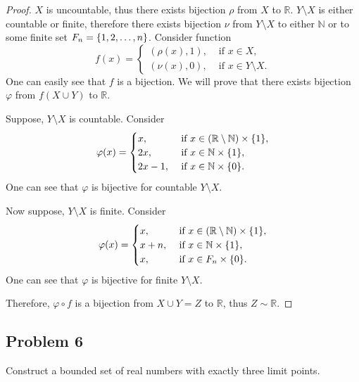 \documentclass{article}
\newcommand{\R}{\mathbb{R}}
\newcommand{\N}{\mathbb{N}}
\DeclarePairedDelimiter{\set}{ \{ }{ \} }
\begin{document}
\begin{proof}

$X$ is uncountable, thus there exists bijection $\rho$ from $X$ to $\R$.
$Y \setminus X$ is either countable or finite, therefore there exists bijection $\nu$ from $Y \setminus X$ to either $\N$ or to some finite set $F_n = \set{1,2,\dots,n}$.
Consider function
\[
    f(x) =
    \begin{cases}
        (\rho(x), 1), & \text{ if $x \in X$}, \\
        (\nu(x), 0),  & \text{ if $x \in Y \setminus X$}.
    \end{cases}
\]
One can easily see that $f$ is a bijection.
We will prove that there exists bijection $\varphi$ from $f(X \cup Y)$ to $\R$.

Suppose, $Y \setminus X$ is countable. Consider
\[
    \varphi(x) = 
    \begin{cases}
        x, & \text{ if $x \in (\R \setminus \N) \times \set{1}$}, \\
        2x, & \text{ if $x \in \N \times \set{1}$}, \\
        2x-1, & \text{ if $x \in \N \times \set{0}$}.
    \end{cases}
\]
One can see that $\varphi$ is bijective for countable $Y \setminus X$.

Now suppose, $Y \setminus X$ is finite. Consider
\[
    \varphi(x) = 
    \begin{cases}
        x, & \text{ if $x \in (\R \setminus \N) \times \set{1}$}, \\
        x + n, & \text{ if $x \in \N \times \set{1}$}, \\
        x, & \text{ if $x \in F_n \times \set{0}$}.
    \end{cases}
\]
One can see that $\varphi$ is bijective for finite $Y \setminus X$.

Therefore, $\varphi \circ f$ is a bijection from $X \cup Y = Z$ to $\R$, thus $Z \sim \R$.

\end{proof}


\subsection*{Problem 6}

\begin{tcolorbox}
Construct a bounded set of real numbers with exactly three limit points.
\end{tcolorbox}
\end{document}
